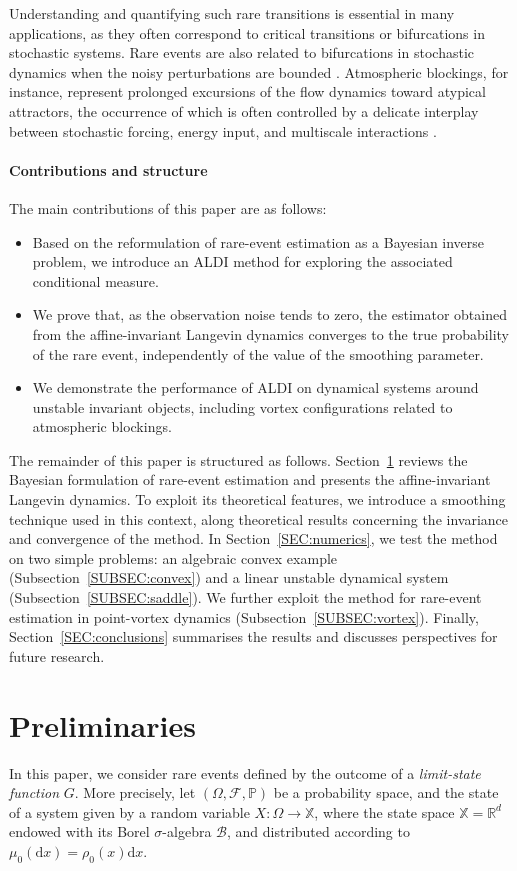 \documentclass[a4paper]{article}
\numberwithin{equation}{section}
\begin{document}
Understanding and quantifying such rare transitions is essential in many applications, as they often correspond to critical transitions or bifurcations in stochastic systems. Rare events are also related to bifurcations in stochastic dynamics when the noisy perturbations are bounded \cite{olicon24,olicon25}. Atmospheric blockings, for instance, represent prolonged excursions of the flow dynamics toward atypical attractors, the occurrence of which is often controlled by a delicate interplay between stochastic forcing, energy input, and multiscale interactions \cite{klein2021,ragone2021}.

\paragraph{Contributions and structure}
The main contributions of this paper are as follows:
\begin{itemize}
    \item Based on the reformulation of rare-event estimation as a Bayesian inverse problem, we introduce an ALDI method for exploring the associated conditional measure.
    \item We prove that, as the observation noise tends to zero, the estimator obtained from the affine-invariant Langevin dynamics converges to the true probability of the rare event, independently of the value of the smoothing parameter.
    \item We demonstrate the performance of ALDI on dynamical systems around unstable invariant objects, including vortex configurations related to atmospheric blockings.
\end{itemize}
The remainder of this paper is structured as follows.
Section~\ref{SEC:preliminaries} reviews the Bayesian formulation of rare-event estimation and presents the affine-invariant Langevin dynamics. To exploit its theoretical features, we introduce a smoothing technique used in this context, along theoretical results concerning the invariance and convergence of the method. In Section~\ref{SEC:numerics}, we test the method on two simple problems: an algebraic convex example (Subsection~\ref{SUBSEC:convex}) and a linear unstable dynamical system (Subsection~\ref{SUBSEC:saddle}). We further exploit the method for rare-event estimation in point-vortex dynamics (Subsection~\ref{SUBSEC:vortex}). Finally, Section~\ref{SEC:conclusions} summarises the results and discusses perspectives for future research.



\section{Preliminaries}
\label{SEC:preliminaries}
In this paper, we consider rare events defined by the outcome of a \textit{limit-state function} $G$. More precisely, let $(\Omega,\mathcal{F},\mathbb{P})$ be a probability space, and the state of a system given by a random variable $X:\Omega\rightarrow \mathbb{X}$, where the state space $\mathbb{X}=\mathbb R^d$ endowed with its Borel $\sigma$-algebra $\mathcal{B}$, and distributed according to $\mu_0(\mathrm d x)=\rho_0(x) \mathrm dx$. 
\end{document}
